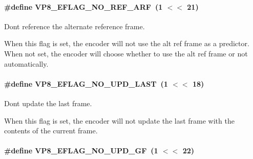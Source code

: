 \paragraph[{\texorpdfstring{V\+P8\+\_\+\+E\+F\+L\+A\+G\+\_\+\+N\+O\+\_\+\+R\+E\+F\+\_\+\+A\+RF}{VP8_EFLAG_NO_REF_ARF}}]{\setlength{\rightskip}{0pt plus 5cm}\#define V\+P8\+\_\+\+E\+F\+L\+A\+G\+\_\+\+N\+O\+\_\+\+R\+E\+F\+\_\+\+A\+RF~(1 $<$$<$ 21)}\hypertarget{group__vp8__encoder_ga650ab0baea12be91082226a5cc18776a}{}\label{group__vp8__encoder_ga650ab0baea12be91082226a5cc18776a}


Don\textquotesingle{}t reference the alternate reference frame. 

When this flag is set, the encoder will not use the alt ref frame as a predictor. When not set, the encoder will choose whether to use the alt ref frame or not automatically. 
\paragraph[{\texorpdfstring{V\+P8\+\_\+\+E\+F\+L\+A\+G\+\_\+\+N\+O\+\_\+\+U\+P\+D\+\_\+\+L\+A\+ST}{VP8_EFLAG_NO_UPD_LAST}}]{\setlength{\rightskip}{0pt plus 5cm}\#define V\+P8\+\_\+\+E\+F\+L\+A\+G\+\_\+\+N\+O\+\_\+\+U\+P\+D\+\_\+\+L\+A\+ST~(1 $<$$<$ 18)}\hypertarget{group__vp8__encoder_ga602edb6b02a89cb2db7a16d6dffba583}{}\label{group__vp8__encoder_ga602edb6b02a89cb2db7a16d6dffba583}


Don\textquotesingle{}t update the last frame. 

When this flag is set, the encoder will not update the last frame with the contents of the current frame. 
\paragraph[{\texorpdfstring{V\+P8\+\_\+\+E\+F\+L\+A\+G\+\_\+\+N\+O\+\_\+\+U\+P\+D\+\_\+\+GF}{VP8_EFLAG_NO_UPD_GF}}]{\setlength{\rightskip}{0pt plus 5cm}\#define V\+P8\+\_\+\+E\+F\+L\+A\+G\+\_\+\+N\+O\+\_\+\+U\+P\+D\+\_\+\+GF~(1 $<$$<$ 22)}\hypertarget{group__vp8__encoder_gab01d066c5236457d345ce1cab4c41d6b}{}\label{group__vp8__encoder_gab01d066c5236457d345ce1cab4c41d6b}


